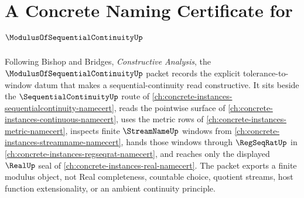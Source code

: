 \chapter{A Concrete Naming Certificate for $\ModulusOfSequentialContinuityUp$}
\label{ch:concrete-instances-modulus-of-sequential-continuity-namecert}

Following Bishop and Bridges, \emph{Constructive Analysis}, the $\ModulusOfSequentialContinuityUp$ packet records the explicit tolerance-to-window datum that makes a sequential-continuity read constructive. It sits beside the $\SequentialContinuityUp$ route of \autoref{ch:concrete-instances-sequentialcontinuity-namecert}, reads the pointwise surface of \autoref{ch:concrete-instances-continuous-namecert}, uses the metric rows of \autoref{ch:concrete-instances-metric-namecert}, inspects finite $\StreamNameUp$ windows from \autoref{ch:concrete-instances-streamname-namecert}, hands those windows through $\RegSeqRatUp$ in \autoref{ch:concrete-instances-regseqrat-namecert}, and reaches only the displayed $\RealUp$ seal of \autoref{ch:concrete-instances-real-namecert}. The packet exports a finite modulus object, not Real completeness, countable choice, quotient streams, host function extensionality, or an ambient continuity principle.

